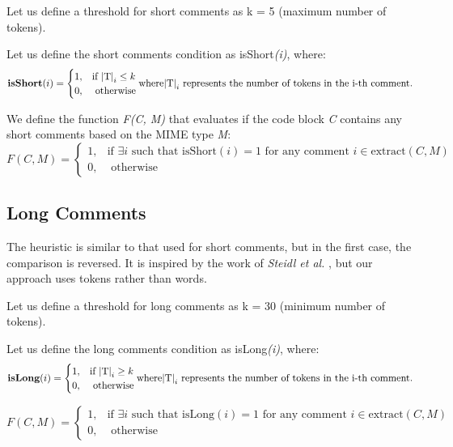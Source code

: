\noindent Let us define a threshold for short comments as k = 5 (maximum number of tokens).

\noindent Let us define the short comments condition as isShort\textit{(i)}, where:
\begin{equation*}
	\textbf{isShort}(i) = \begin{cases}
		1, & \text{if } \mathrm{|T|}_{i} \le k \\
		0, & \text{ otherwise}
	\end{cases}
	
	\noindent \text{where} \mathrm{|T|}_{i} \text{ represents the number of tokens in the i-th comment.}
\end{equation*}

\noindent We define the function \textit{F(C, M)} that evaluates if the code block \textit{C} contains any short comments based on the MIME type \textit{M}:
\begin{equation*}
	F(C, M) = \begin{cases}
		1, & \text{if } \exists i \text{ such that } \text{isShort}(i) = 1 \text{ for any comment } i \in \text{extract}(C, M) \\
		0, & \text{ otherwise}
	\end{cases}
\end{equation*}

\subsection{Long Comments}
The heuristic is similar to that used for short comments, but in the first case, the comparison is reversed.
It is inspired by the work of \textit{Steidl et al.} \cite{steidl2013}, but our approach uses tokens rather than words.

\noindent Let us define a threshold for long comments as k = 30 (minimum number of tokens).

\noindent Let us define the long comments condition as isLong\textit{(i)}, where:
\begin{equation*}
	\textbf{isLong}(i) = \begin{cases}
		1, & \text{if } \mathrm{|T|}_{i} \ge k \\
		0, & \text{ otherwise}
	\end{cases}
	
	\noindent \text{where} \mathrm{|T|}_{i} \text{ represents the number of tokens in the i-th comment.}
\end{equation*}

\begin{equation*}
	F(C, M) = \begin{cases}
		1, & \text{if } \exists i \text{ such that } \text{isLong}(i) = 1 \text{ for any comment } i \in \text{extract}(C, M) \\
		0, & \text{ otherwise}
	\end{cases}
\end{equation*}

